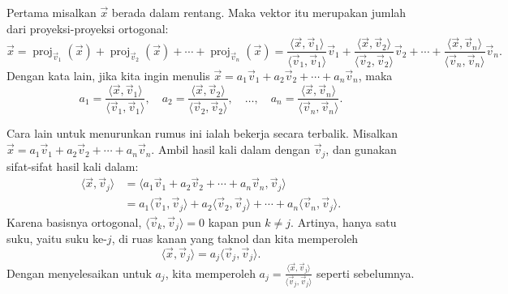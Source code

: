 Pertama misalkan $\vec{x}$ berada dalam rentang. Maka vektor itu merupakan jumlah dari
proyeksi-proyeksi ortogonal:
\begin{equation*}
\vec{x} =
\operatorname{proj}_{\vec{v}_1} ( \vec{x} )
+
\operatorname{proj}_{\vec{v}_2} ( \vec{x} )
+
\cdots
+
\operatorname{proj}_{\vec{v}_n} ( \vec{x} )
=
\frac{\langle \vec{x}, \vec{v}_1 \rangle}{
\langle \vec{v}_1, \vec{v}_1 \rangle
}
\vec{v}_1
+
\frac{\langle \vec{x}, \vec{v}_2 \rangle}{
\langle \vec{v}_2, \vec{v}_2 \rangle
}
\vec{v}_2
+
\cdots
+
\frac{\langle \vec{x}, \vec{v}_n \rangle}{
\langle \vec{v}_n, \vec{v}_n \rangle
}
\vec{v}_n .
\end{equation*}
Dengan kata lain, jika kita ingin menulis
$\vec{x} =
a_1 \vec{v}_1 +
a_2 \vec{v}_2 + \cdots +
a_n \vec{v}_n$, maka
\begin{equation*}
a_1 =
\frac{\langle \vec{x}, \vec{v}_1 \rangle}{
\langle \vec{v}_1, \vec{v}_1 \rangle
} , \quad
a_2 =
\frac{\langle \vec{x}, \vec{v}_2 \rangle}{
\langle \vec{v}_2, \vec{v}_2 \rangle
} , \quad \ldots , \quad
a_n =
\frac{\langle \vec{x}, \vec{v}_n \rangle}{
\langle \vec{v}_n, \vec{v}_n \rangle
} .
\end{equation*}

Cara lain untuk menurunkan rumus ini ialah bekerja secara terbalik. Misalkan
$\vec{x} =
a_1 \vec{v}_1 +
a_2 \vec{v}_2 + \cdots +
a_n \vec{v}_n$. Ambil hasil kali dalam dengan $\vec{v}_j$, dan
gunakan sifat-sifat hasil kali dalam:
\begin{equation*}
\begin{split}
\langle \vec{x} , \vec{v}_j \rangle
& =
\langle a_1 \vec{v}_1 +
a_2 \vec{v}_2 + \cdots +
a_n \vec{v}_n , \vec{v}_j \rangle
\\
& =
a_1 \langle \vec{v}_1 , \vec{v}_j \rangle +
a_2 \langle \vec{v}_2 , \vec{v}_j \rangle +
\cdots +
a_n \langle \vec{v}_n , \vec{v}_j \rangle .
\end{split}
\end{equation*}
Karena basisnya ortogonal,
$\langle \vec{v}_k , \vec{v}_j \rangle = 0$ kapan pun
$k \neq j$. Artinya, hanya satu suku, yaitu suku ke-$j$,
di ruas kanan yang taknol dan kita memperoleh
\begin{equation*}
\langle \vec{x} , \vec{v}_j \rangle
=
a_j \langle \vec{v}_j , \vec{v}_j \rangle .
\end{equation*}
Dengan menyelesaikan untuk $a_j$, kita memperoleh $a_j =
\frac{\langle \vec{x}, \vec{v}_j \rangle}{
\langle \vec{v}_j, \vec{v}_j \rangle
}$ seperti sebelumnya.

